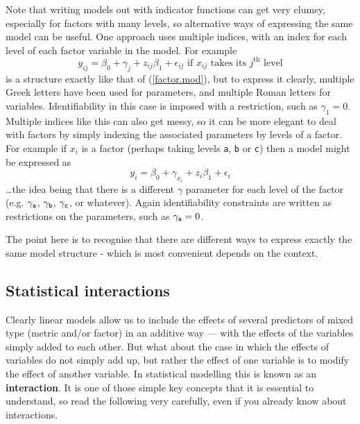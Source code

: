 \documentclass[10pt] {article}
\theoremstyle{definition}
\begin{document}
Note that writing models out with indicator functions can get very clumsy, especially for factors with many levels, so alternative ways of expressing the same model can be useful. One approach uses multiple indices, with an index for each level of each factor variable in the model. For example 
$$
y_{ij} = \beta_0 + \gamma_j + z_{ij} \beta_1 + \epsilon_{ij} \text{  if }x_{ij}\text{ takes its }j^\text{th}\text{ level}
$$
is a structure exactly like that of (\ref{factor.mod}), but to express it clearly, multiple Greek letters have been used for parameters, and multiple Roman letters for variables. Identifiability in this case is imposed with a restriction, such as $\gamma_1=0$. Multiple indices like this can also get messy, so it can be more elegant to deal with factors by simply indexing the associated parameters by levels of a factor. For example if $x_i$ is a factor (perhaps taking levels {\tt a}, {\tt b} or {\tt c}) then a model might be expressed as
$$
y_i = \beta_0 + \gamma_{x_i} + z_i \beta_1 + \epsilon_i
$$ 
\ldots the idea being that there is a different $\gamma$ parameter for each level of the factor (e.g. $\gamma_{\tt a}$, $\gamma_{\tt b}$, $\gamma_{\tt c}$, or whatever). Again identifiability constraints are written as restrictions on the parameters, such as $\gamma_{\tt a}=0$. 

The point here is to recognise that there are different ways to express exactly the same model structure - which is most convenient depends on the context. 


\subsection{Statistical interactions}

Clearly linear models allow us to include the effects of several predictors of mixed type (metric and/or factor) in an additive way --- with the effects of the variables simply added to each other. But what about the case in which the effects of variables do not simply add up, but rather the effect of one variable is to modify the effect of another variable. In statistical modelling this is known as an {\bf interaction}. It is one of those simple key concepts that it is essential to understand, so read the following very carefully, even if you already know about interactions.
\end{document}
